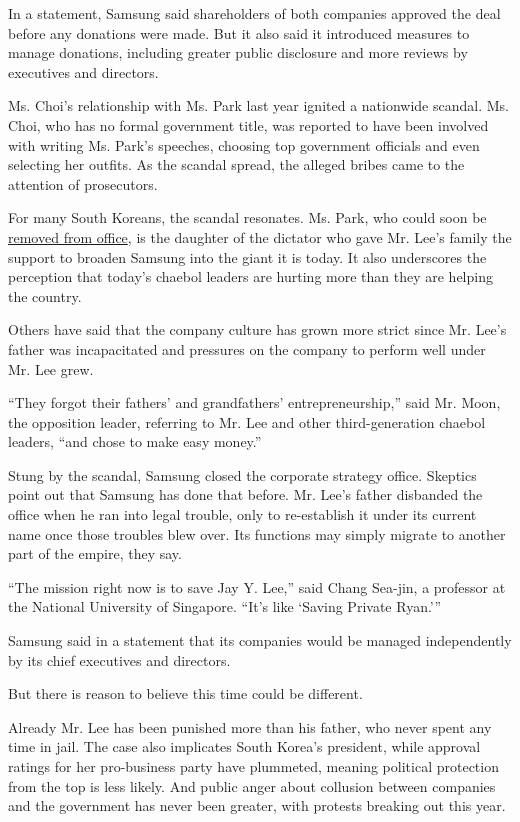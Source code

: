 In a statement, Samsung said shareholders of both companies approved the
deal before any donations were made. But it also said it introduced
measures to manage donations, including greater public disclosure and
more reviews by executives and directors.

Ms. Choi's relationship with Ms. Park last year ignited a nationwide
scandal. Ms. Choi, who has no formal government title, was reported to
have been involved with writing Ms. Park's speeches, choosing top
government officials and even selecting her outfits. As the scandal
spread, the alleged bribes came to the attention of prosecutors.

For many South Koreans, the scandal resonates. Ms. Park, who could soon
be
\href{https://www.nytimes3xbfgragh.onion/2016/12/22/world/asia/south-korea-president-park-impeachment.html}{removed
from office}, is the daughter of the dictator who gave Mr. Lee's family
the support to broaden Samsung into the giant it is today. It also
underscores the perception that today's chaebol leaders are hurting more
than they are helping the country.

Others have said that the company culture has grown more strict since
Mr. Lee's father was incapacitated and pressures on the company to
perform well under Mr. Lee grew.

``They forgot their fathers' and grandfathers' entrepreneurship,'' said
Mr. Moon, the opposition leader, referring to Mr. Lee and other
third-generation chaebol leaders, ``and chose to make easy money.''

Stung by the scandal, Samsung closed the corporate strategy office.
Skeptics point out that Samsung has done that before. Mr. Lee's father
disbanded the office when he ran into legal trouble, only to
re-establish it under its current name once those troubles blew over.
Its functions may simply migrate to another part of the empire, they
say.

``The mission right now is to save Jay Y. Lee,'' said Chang Sea-jin, a
professor at the National University of Singapore. ``It's like `Saving
Private Ryan.'''

Samsung said in a statement that its companies would be managed
independently by its chief executives and directors.

But there is reason to believe this time could be different.

Already Mr. Lee has been punished more than his father, who never spent
any time in jail. The case also implicates South Korea's president,
while approval ratings for her pro-business party have plummeted,
meaning political protection from the top is less likely. And public
anger about collusion between companies and the government has never
been greater, with protests breaking out this year.

